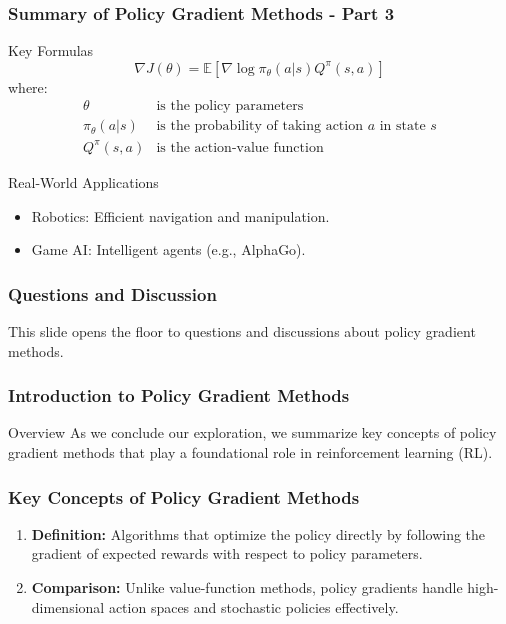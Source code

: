 \documentclass[aspectratio=169]{beamer}
\begin{document}
\begin{frame}[fragile]
    \frametitle{Summary of Policy Gradient Methods - Part 3}
    \begin{block}{Key Formulas}
        \begin{equation}
            \nabla J(\theta) = \mathbb{E} \left[ \nabla \log \pi_\theta(a|s) Q^\pi(s, a) \right]
        \end{equation}
        where:
        \[
        \begin{array}{ll}
            \theta & \text{is the policy parameters} \\
            \pi_\theta(a|s) & \text{is the probability of taking action } a \text{ in state } s \\
            Q^\pi(s, a) & \text{is the action-value function}
        \end{array}
        \]
    \end{block}

    \begin{block}{Real-World Applications}
        \begin{itemize}
            \item Robotics: Efficient navigation and manipulation.
            \item Game AI: Intelligent agents (e.g., AlphaGo).
        \end{itemize}
    \end{block}
\end{frame}

\begin{frame}
    \frametitle{Questions and Discussion}
    This slide opens the floor to questions and discussions about policy gradient methods.
\end{frame}

\begin{frame}
    \frametitle{Introduction to Policy Gradient Methods}
    \begin{block}{Overview}
        As we conclude our exploration, we summarize key concepts of policy gradient methods that play a foundational role in reinforcement learning (RL).
    \end{block}
\end{frame}

\begin{frame}
    \frametitle{Key Concepts of Policy Gradient Methods}
    \begin{enumerate}
        \item \textbf{Definition:} Algorithms that optimize the policy directly by following the gradient of expected rewards with respect to policy parameters.
        \item \textbf{Comparison:} Unlike value-function methods, policy gradients handle high-dimensional action spaces and stochastic policies effectively.
    \end{enumerate}
\end{frame}
\end{document}
